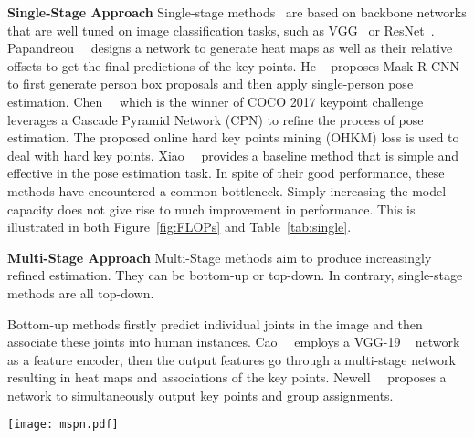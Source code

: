 \documentclass[10pt,twocolumn,letterpaper]{article}
\begin{document}
{\bfseries Single-Stage Approach} Single-stage methods~\cite{papandreou2017towards,he2017mask,chen2018cascaded,xiao2018simple} are based on backbone networks that are well tuned on image classification tasks, such as VGG~\cite{simonyan2014very} or ResNet~\cite{he2016deep}. Papandreou~\etal ~\cite{papandreou2017towards} designs a network to generate heat maps as well as their relative offsets to get the final predictions of the key points. He \etal ~\cite{he2017mask} proposes Mask R-CNN to first generate person box proposals and then apply single-person pose estimation. Chen~\etal ~\cite{chen2018cascaded} which is the winner of COCO 2017 keypoint challenge leverages a Cascade Pyramid Network (CPN) to refine the process of pose estimation. The proposed online hard key points mining (OHKM) loss is used to deal with hard key points. Xiao~\etal~\cite{xiao2018simple} provides a baseline method that is simple and effective in the pose estimation task. In spite of their good performance, these methods have encountered a common bottleneck. Simply increasing the model capacity does not give rise to much improvement in performance. This is illustrated in both Figure~\ref{fig:FLOPs} and Table~\ref{tab:single}.

{\bfseries Multi-Stage Approach} Multi-Stage methods\cite{wei2016convolutional,cao2016realtime,newell2017associative,newell2016stacked,yang2017learning,ke2018multi} aim to produce increasingly refined estimation. They can be bottom-up or top-down. In contrary, single-stage methods are all top-down.

Bottom-up methods firstly predict individual joints in the image and then associate these joints into human instances.  Cao~\etal~\cite{cao2016realtime} employs a VGG-19 ~\cite{simonyan2014very} network as a feature encoder, then the output features go through a multi-stage network resulting in heat maps and associations of the key points. Newell~\etal~\cite{newell2017associative} proposes a network to simultaneously output key points and group assignments.

\begin{figure*}[t]
	\centering
	\texttt{[image: mspn.pdf]}
	\caption{Overview of Multi-Stage Pose Network~(MSPN). It is composed of two single-stage modules. A cross stage aggregation strategy~(zoomed in Figure~\ref{fig:aggr}) is adopted between  adjacent stages~(Section~\ref{section:CSFA}). A coarse-to-fine supervision strategy further improves localization accuracy~(Section~\ref{setion:C2F}).}\label{fig:mspn}
\end{figure*}
\end{document}
